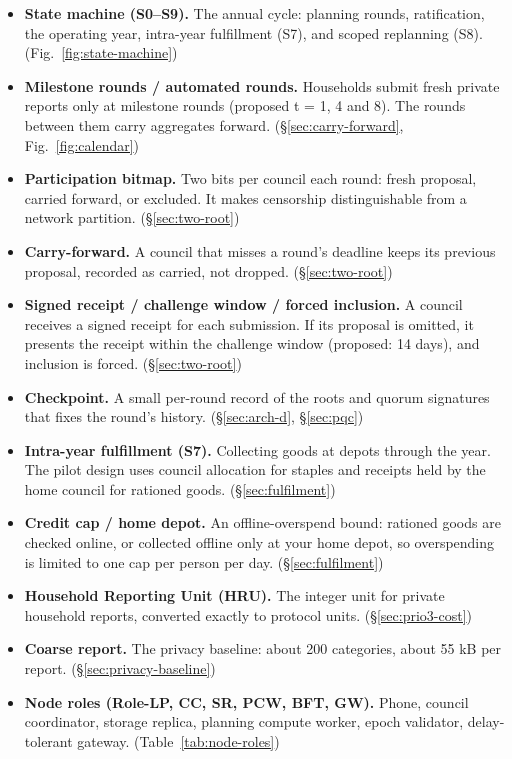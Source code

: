 \documentclass[10pt,twoside,openany]{book}
\theoremstyle{dpepstyle}
\begin{document}
\begin{itemize}[leftmargin=1.2em,itemsep=2pt,topsep=2pt]
\item \textbf{State machine (S0--S9).} The annual cycle: planning rounds, ratification, the operating year, intra-year fulfillment (S7), and scoped replanning (S8). (Fig.~\ref{fig:state-machine})
\item \textbf{Milestone rounds / automated rounds.} Households submit fresh private reports only at milestone rounds (proposed t = 1, 4 and 8). The rounds between them carry aggregates forward. (\S\ref{sec:carry-forward}, Fig.~\ref{fig:calendar})
\item \textbf{Participation bitmap.} Two bits per council each round: fresh proposal, carried forward, or excluded. It makes censorship distinguishable from a network partition. (\S\ref{sec:two-root})
\item \textbf{Carry-forward.} A council that misses a round's deadline keeps its previous proposal, recorded as carried, not dropped. (\S\ref{sec:two-root})
\item \textbf{Signed receipt / challenge window / forced inclusion.} A council receives a signed receipt for each submission. If its proposal is omitted, it presents the receipt within the challenge window (proposed: 14 days), and inclusion is forced. (\S\ref{sec:two-root})
\item \textbf{Checkpoint.} A small per-round record of the roots and quorum signatures that fixes the round's history. (\S\ref{sec:arch-d}, \S\ref{sec:pqc})
\item \textbf{Intra-year fulfillment (S7).} Collecting goods at depots through the year. The pilot design uses council allocation for staples and receipts held by the home council for rationed goods. (\S\ref{sec:fulfilment})
\item \textbf{Credit cap / home depot.} An offline-overspend bound: rationed goods are checked online, or collected offline only at your home depot, so overspending is limited to one cap per person per day. (\S\ref{sec:fulfilment})
\item \textbf{Household Reporting Unit (HRU).} The integer unit for private household reports, converted exactly to protocol units. (\S\ref{sec:prio3-cost})
\item \textbf{Coarse report.} The privacy baseline: about 200 categories, about 55 kB per report. (\S\ref{sec:privacy-baseline})
\item \textbf{Node roles (Role-LP, CC, SR, PCW, BFT, GW).} Phone, council coordinator, storage replica, planning compute worker, epoch validator, delay-tolerant gateway. (Table~\ref{tab:node-roles})
\end{itemize}
\end{document}
